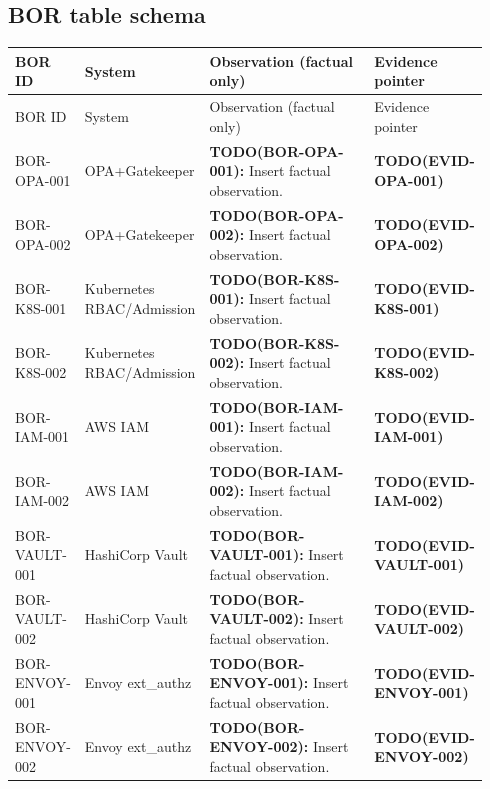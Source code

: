 \subsection{BOR table schema}
\begin{center}
\begin{longtable}{@{}p{0.12\linewidth}p{0.16\linewidth}p{0.46\linewidth}p{0.20\linewidth}@{}}
\toprule
BOR ID & System & Observation (factual only) & Evidence pointer \\
\midrule
\endfirsthead
\toprule
BOR ID & System & Observation (factual only) & Evidence pointer \\
\midrule
\endhead
\bottomrule
\endfoot
\bottomrule
\endlastfoot
BOR-OPA-001 & OPA+Gatekeeper & \textbf{TODO(BOR-OPA-001):} Insert factual observation. & \textbf{TODO(EVID-OPA-001)} \\
BOR-OPA-002 & OPA+Gatekeeper & \textbf{TODO(BOR-OPA-002):} Insert factual observation. & \textbf{TODO(EVID-OPA-002)} \\

BOR-K8S-001 & Kubernetes RBAC/Admission & \textbf{TODO(BOR-K8S-001):} Insert factual observation. & \textbf{TODO(EVID-K8S-001)} \\
BOR-K8S-002 & Kubernetes RBAC/Admission & \textbf{TODO(BOR-K8S-002):} Insert factual observation. & \textbf{TODO(EVID-K8S-002)} \\

BOR-IAM-001 & AWS IAM & \textbf{TODO(BOR-IAM-001):} Insert factual observation. & \textbf{TODO(EVID-IAM-001)} \\
BOR-IAM-002 & AWS IAM & \textbf{TODO(BOR-IAM-002):} Insert factual observation. & \textbf{TODO(EVID-IAM-002)} \\

BOR-VAULT-001 & HashiCorp Vault & \textbf{TODO(BOR-VAULT-001):} Insert factual observation. & \textbf{TODO(EVID-VAULT-001)} \\
BOR-VAULT-002 & HashiCorp Vault & \textbf{TODO(BOR-VAULT-002):} Insert factual observation. & \textbf{TODO(EVID-VAULT-002)} \\

BOR-ENVOY-001 & Envoy ext\_authz & \textbf{TODO(BOR-ENVOY-001):} Insert factual observation. & \textbf{TODO(EVID-ENVOY-001)} \\
BOR-ENVOY-002 & Envoy ext\_authz & \textbf{TODO(BOR-ENVOY-002):} Insert factual observation. & \textbf{TODO(EVID-ENVOY-002)} \\


\end{longtable}
\end{center}

